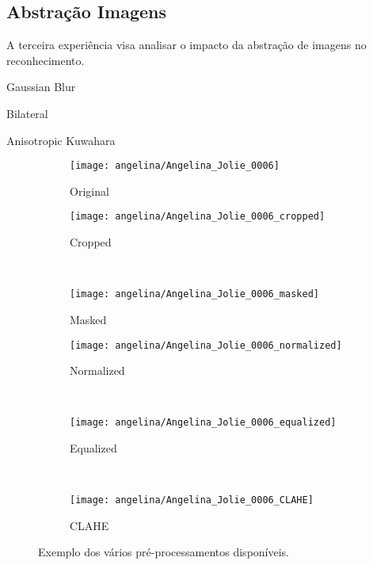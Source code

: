 \subsection{Abstração Imagens}
A terceira experiência visa analisar o impacto da abstração de imagens no reconhecimento.

Gaussian Blur

Bilateral

Anisotropic Kuwahara

\begin{figure}
        \centering
        \begin{subfigure}[b]{0.2\textwidth}
                \centering
                \texttt{[image: angelina/Angelina\_Jolie\_0006]}
                \caption{Original}
                \label{fig:original} 
        \end{subfigure}%
%

        \begin{subfigure}[b]{0.2\textwidth}
                \centering
                \texttt{[image: angelina/Angelina\_Jolie\_0006\_cropped]}
                \caption{Cropped}
                \label{fig:cropped} 
        \end{subfigure}
        ~ ~
        \begin{subfigure}[b]{0.2\textwidth}
                \centering
                \texttt{[image: angelina/Angelina\_Jolie\_0006\_masked]}
                \caption{Masked}
                \label{fig:masked}
        \end{subfigure}%
%

        \begin{subfigure}[b]{0.2\textwidth}
                \centering
                \texttt{[image: angelina/Angelina\_Jolie\_0006\_normalized]}
                \caption{Normalized}
                \label{fig:normalized} 
        \end{subfigure}
        ~ ~
        \begin{subfigure}[b]{0.2\textwidth}
                \centering
                \texttt{[image: angelina/Angelina\_Jolie\_0006\_equalized]}
                \caption{Equalized}
                \label{fig:equalized}
        \end{subfigure}
        ~ ~
        \begin{subfigure}[b]{0.2\textwidth}
                \centering
                \texttt{[image: angelina/Angelina\_Jolie\_0006\_CLAHE]}
                \caption{CLAHE}
                \label{fig:clahe}
        \end{subfigure}
        \caption{Exemplo dos vários pré-processamentos disponíveis.}
        \label{fig:galeriaspreprocessadas}   
\end{figure}



